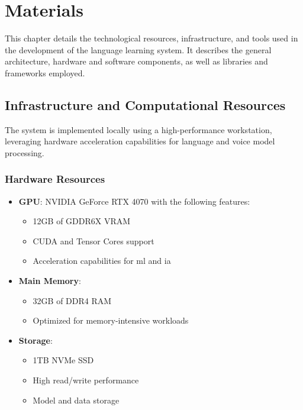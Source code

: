 \chapter{Materials}
\label{materials}

This chapter details the technological resources, infrastructure, and tools used in the development of the language learning system. It describes the general architecture, hardware and software components, as well as libraries and frameworks employed.

\section{Infrastructure and Computational Resources}

The system is implemented locally using a high-performance workstation, leveraging hardware acceleration capabilities for language and voice model processing.

\subsection{Hardware Resources}

\begin{itemize}
	\item \textbf{GPU}: NVIDIA GeForce RTX 4070 with the following features:
	      \begin{itemize}
		      \item 12GB of GDDR6X VRAM
		      \item CUDA and Tensor Cores support
		      \item Acceleration capabilities for \gls{ml} and \gls{ia}
	      \end{itemize}

	\item \textbf{Main Memory}:
	      \begin{itemize}
		      \item 32GB of DDR4 RAM
		      \item Optimized for memory-intensive workloads
	      \end{itemize}

	\item \textbf{Storage}:
	      \begin{itemize}
		      \item 1TB NVMe SSD
		      \item High read/write performance
		      \item Model and data storage
	      \end{itemize}
\end{itemize}


